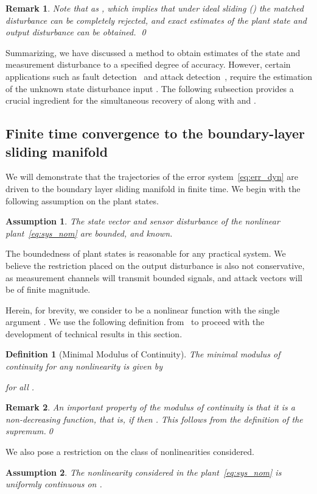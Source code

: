 \documentclass[times, doublespace]{rncauth}
\newtheorem{definition}{Definition}
\newtheorem{assumption}{Assumption}
\newtheorem{remark}{Remark}
\begin{document}
\begin{remark}
	Note that  as , which implies that under ideal sliding () the matched disturbance can be completely rejected, and exact estimates of the plant state  and output disturbance  can be obtained.
	\qed\end{remark}


Summarizing, we have discussed a method to obtain estimates of the state  and measurement disturbance  to a specified degree of accuracy. However, certain applications such as fault detection~\cite{yan07} and attack detection~\cite{Teixeira2010,Pasqualetti2013,Mo2014}, require the estimation of the unknown state disturbance input . The following subsection provides a crucial ingredient for the simultaneous recovery of  along with  and .
\subsection{Finite time convergence to the boundary-layer sliding manifold}
We will demonstrate that the trajectories of the error system~\eqref{eq:err_dyn} are driven to the boundary layer sliding manifold in finite time. We begin with the following assumption on the plant states.
\begin{assumption}\label{asmp:plant_bdd}
The state vector  and sensor disturbance  of the nonlinear plant~\eqref{eq:sys_nom} are bounded, and known.
\end{assumption}
The boundedness of plant states is reasonable for any practical system. We believe the restriction placed on the output disturbance is also not conservative, as measurement channels will transmit bounded signals, and attack vectors will be of finite magnitude.

Herein, for brevity, we consider  to be a nonlinear function with the single argument . We use the following definition from~\cite[p. 406]{Aronszajn1956} to proceed with the development of technical results in this section. 
\begin{definition}[Minimal Modulus of Continuity]
	The minimal modulus of continuity for any nonlinearity  is given by
	 
	for all .
\end{definition}
\begin{remark}\label{rk:mod_of_cont_dec}
	An important property of the modulus of continuity is that it is a non-decreasing function, that is, if  then . This follows from the definition of the supremum.\qed
	\end{remark}
We also pose a restriction on the class of nonlinearities considered.
\begin{assumption}\label{ass:uc_r_to_zero}
	The nonlinearity  considered in the plant~\eqref{eq:sys_nom} is uniformly continuous on .
\end{assumption}
\end{document}
